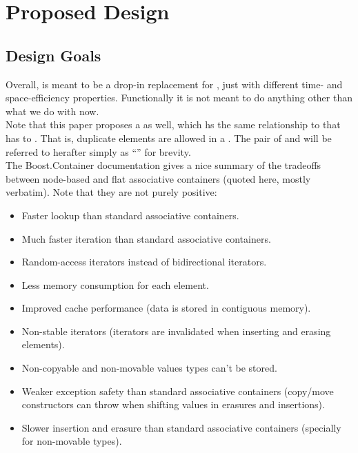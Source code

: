 \section{Proposed Design}

\subsection{Design Goals}

Overall,  is meant to be a drop-in replacement for ,
just with different time- and space-efficiency properties.  Functionally it is
not meant to do anything other than what we do with  now.\\

Note that this paper proposes a  as well, which hs the
same relationship to  that  has to .
That is, duplicate elements are allowed in a .  The pair
of  and  will be referred to herafter
simply as ``'' for brevity.\\

The Boost.Container documentation gives a nice summary of the tradeoffs
between node-based and flat associative containers (quoted here, mostly
verbatim).  Note that they are not purely positive:

\begin{itemize}
  \item Faster lookup than standard associative containers.

  \item Much faster iteration than standard associative
    containers.

  \item Random-access iterators instead of bidirectional iterators.

  \item Less memory consumption for each element.

  \item Improved cache performance (data is stored in contiguous memory).

  \item Non-stable iterators (iterators are invalidated when inserting and
    erasing elements).

  \item Non-copyable and non-movable values types can't be stored.

  \item Weaker exception safety than standard associative containers
    (copy/move constructors can throw when shifting values in erasures and
    insertions).

  \item Slower insertion and erasure than standard associative containers
    (specially for non-movable types).
\end{itemize}

